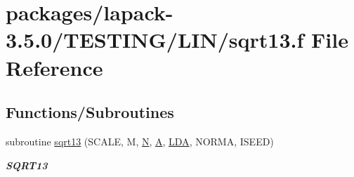 \hypertarget{sqrt13_8f}{}\section{packages/lapack-\/3.5.0/\+T\+E\+S\+T\+I\+N\+G/\+L\+I\+N/sqrt13.f File Reference}
\label{sqrt13_8f}
\subsection*{Functions/\+Subroutines}
\begin{DoxyCompactItemize}
\item 
subroutine \hyperlink{group__single__lin_ga8d7580685a1898f93b5ac843aab10b42}{sqrt13} (S\+C\+A\+L\+E, M, \hyperlink{polmisc_8c_a0240ac851181b84ac374872dc5434ee4}{N}, \hyperlink{classA}{A}, \hyperlink{example__user_8c_ae946da542ce0db94dced19b2ecefd1aa}{L\+D\+A}, N\+O\+R\+M\+A, I\+S\+E\+E\+D)
\begin{DoxyCompactList}\small\item\em {\bfseries S\+Q\+R\+T13} \end{DoxyCompactList}\end{DoxyCompactItemize}
